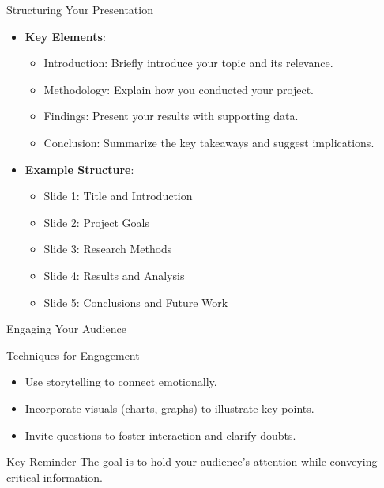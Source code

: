 \documentclass[aspectratio=169]{beamer}
\begin{document}
\begin{frame}[fragile]{Structuring Your Presentation}
    \begin{itemize}
        \item \textbf{Key Elements}:
        \begin{itemize}
            \item Introduction: Briefly introduce your topic and its relevance.
            \item Methodology: Explain how you conducted your project.
            \item Findings: Present your results with supporting data.
            \item Conclusion: Summarize the key takeaways and suggest implications.
        \end{itemize}
        \item \textbf{Example Structure}:
        \begin{itemize}
            \item Slide 1: Title and Introduction
            \item Slide 2: Project Goals
            \item Slide 3: Research Methods
            \item Slide 4: Results and Analysis
            \item Slide 5: Conclusions and Future Work
        \end{itemize}
    \end{itemize}
\end{frame}

\begin{frame}[fragile]{Engaging Your Audience}
    \begin{block}{Techniques for Engagement}
        \begin{itemize}
            \item Use storytelling to connect emotionally.
            \item Incorporate visuals (charts, graphs) to illustrate key points.
            \item Invite questions to foster interaction and clarify doubts.
        \end{itemize}
    \end{block}
    \begin{block}{Key Reminder}
        The goal is to hold your audience's attention while conveying critical information.
    \end{block}
\end{frame}
\end{document}
